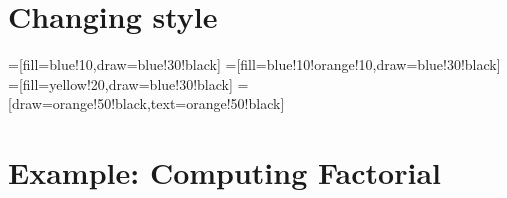 \documentclass{article}
\begin{document}

\section{Changing style}

{%
=[fill=blue!10,draw=blue!30!black]
=[fill=blue!10!orange!10,draw=blue!30!black]
=[fill=yellow!20,draw=blue!30!black]
=[draw=orange!50!black,text=orange!50!black]

\begin{drawstack}
   
\end{drawstack}
}

\section{Example: Computing Factorial}

\begin{drawstack}[scale=0.8]
  \startframe
  \startframe
  \cell{$\vdots$}
  \startframe
\end{drawstack}
\end{document}
